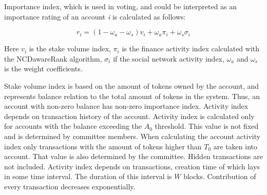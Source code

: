 \documentclass[a4paper,12pt]{article}
\begin{document}
Importance index, which is used in voting, and could be interpreted as an importance rating of an account \textit{i} is calculated as follows: 

\begin{equation}
    \label{importance_rating}
    r_i = (1 - \omega_a - \omega_s) v_i + \omega_a \pi_i + \omega_s \sigma_i
\end{equation}


Here $v_i$ is the stake volume index, $\pi_i$ is the finance activity index calculated with the NCDawareRank algorithm, $\sigma_i$ if the social network activity index, $\omega_a$ and $\omega_s$ is the weight coefficients. 


Stake volume index is based on the amount of tokens owned by the account, and represents balance relation to the total amount of tokens in the system. Thus, an account with non-zero balance has non-zero importance index. Activity index depends on transaction history of the account. Activity index is calculated only for accounts with the balance exceeding the $A_0$ threshold. This value is not fixed and is determined by committee members. When calculating the account activity index only transactions with the amount of tokens higher than $T_0$ are taken into account. That value is also determined by the committee. Hidden transactions are not included. Activity index depends on transactions, creation time of which lays in some time interval. The duration of this interval is $W$ blocks. Contribution of every transaction decreases exponentially.

\end{document}
